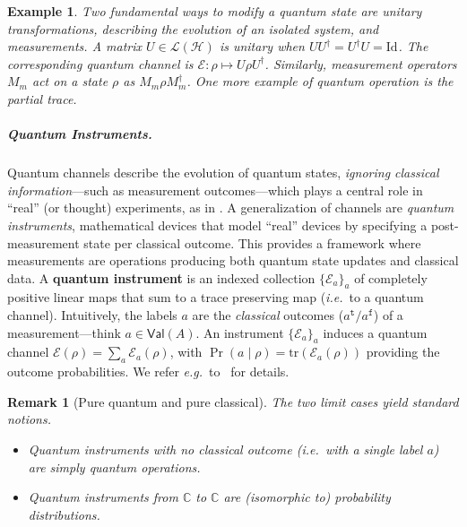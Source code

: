 \documentclass[10pt,a4paper]{article}
\newcommand*{\ie}{\emph{i.e.}\xspace}
\newcommand*{\eg}{\emph{e.g.}\xspace}
\newcommand{\true}{\mathtt{t}}
\newcommand{\false}{\mathtt{f}}
\newcommand{\Real}{\mathbb{R}}
\newcommand{\netE}{\mathcal E}
\newcommand{\E}{\netE}
\newcommand{\nnReal}{\Real^+_0}
\newcommand*{\setofrv}[1]{\mathsf{Val}(#1)}
\newcommand{\bx}{{\mathbf x}}
\newcommand{\tr}[1]{\mathrm{tr}\left(#1\right)}
\renewcommand{\L}{\mathcal{L}}
\newcommand*{\C}{\mathbb{C}}
\newcommand{\HH}{\mathcal{H}}
\newcommand*{\id}[1][]{\mathrm{Id}_{#1}}
\newtheorem{example}[theorem]{Example}
\newtheorem{remark}[theorem]{Remark}
\begin{document}
\begin{example}
Two fundamental ways to modify a quantum state are \emph{unitary transformations}, describing the evolution of an isolated system, and \emph{measurements}.
A matrix $U\in\L(\HH)$ is unitary when $UU^\dagger = U^\dagger U = \id$.
The corresponding quantum channel is $\E:\rho \mapsto U \rho U^\dagger$.
Similarly, measurement operators $M_m$ act on a state $\rho$ as $M_m \rho M_m^\dagger$.
One more example of quantum operation is the partial trace.
\end{example}

\subparagraph{Quantum Instruments.}

Quantum channels describe the evolution of quantum states, \emph{ignoring classical information}---such as measurement outcomes---which plays a central role in ``real'' (or thought) experiments, as in .
A generalization of channels are \emph{quantum instruments}, mathematical devices that model ``real'' devices by specifying a post-measurement state per classical outcome.
This provides a framework where measurements are operations producing both quantum state updates and classical data.
A \textbf{quantum instrument} is an indexed collection $\{\E_a\}_a$ of completely positive linear maps that sum to a trace preserving map (\ie\ to a quantum channel).
Intuitively, the labels $a$ are the \emph{classical} outcomes ($a^\true/a^\false$) of a measurement---think $a\in \setofrv{A}$.
An instrument $\{\mathcal{E}_{a}\}_{a}$ induces a quantum channel $\mathcal{E}(\rho) =\sum_{a} \mathcal{E}_{a}(\rho)$, with $\Pr(a \mid \rho) = \tr{\mathcal{\E}_{a}(\rho)}$ providing the outcome probabilities.
We refer \eg\ to~\cite[page~112]{Watrous_book} for details.

\begin{remark}[Pure quantum and pure classical]
\label{rem:qi_pr}
The two limit cases yield standard notions.
\begin{itemize}
\item
Quantum instruments with no classical outcome (\ie\ with a single label $a$) are simply quantum operations.
\item
Quantum instruments from $\C$ to $\C$ are (isomorphic to) probability distributions.
\end{itemize}
\end{remark}
\end{document}
